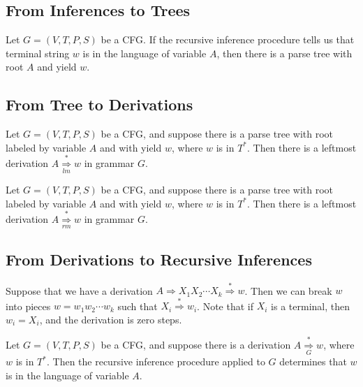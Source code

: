 \documentclass[]{article}
\begin{document}
  \subsection*{From Inferences to Trees}
    \begin{thm}
      Let $G = (V,T,P,S)$ be a CFG. If the recursive inference procedure tells
      us that terminal string $w$ is in the language of variable $A$, then there
      is a parse tree with root $A$ and yield $w$.
    \end{thm}

  \subsection*{From Tree to Derivations}
    \begin{thm}
      Let $G = (V,T,P,S)$ be a CFG, and suppose there is a parse tree with root
      labeled by variable $A$ and with yield $w$, where $w$ is in $T^*$. Then
      there is a leftmost derivation
      $A \overset{*}{\underset{lm}{\Rightarrow}} w$ in grammar $G$.
    \end{thm}
    \begin{thm}
      Let $G = (V,T,P,S)$ be a CFG, and suppose there is a parse tree with root
      labeled by variable $A$ and with yield $w$, where $w$ is in $T^*$. Then
      there is a leftmost derivation
      $A \overset{*}{\underset{rm}{\Rightarrow}} w$ in grammar $G$.
    \end{thm}

  \subsection*{From Derivations to Recursive Inferences}
    Suppose that we have a derivation $A \Rightarrow X_1X_2\cdots{}X_k
    \overset{*}{\Rightarrow} w$. Then we can break $w$ into pieces $w =
    w_1w_2\cdots{}w_k$ such that $X_i \overset{*}{\Rightarrow} w_i$. Note that
    if $X_i$ is a terminal, then $w_i = X_i$, and the derivation is zero steps.
      \begin{thm}
        Let $G = (V,T,P,S)$ be a CFG, and suppose there is a derivation $A
        \overset{*}{\underset{G}{\Rightarrow}} w$, where $w$ is in $T^*$. Then
        the recursive inference procedure applied to $G$ determines that $w$ is
        in the language of variable $A$.
      \end{thm}
\end{document}
